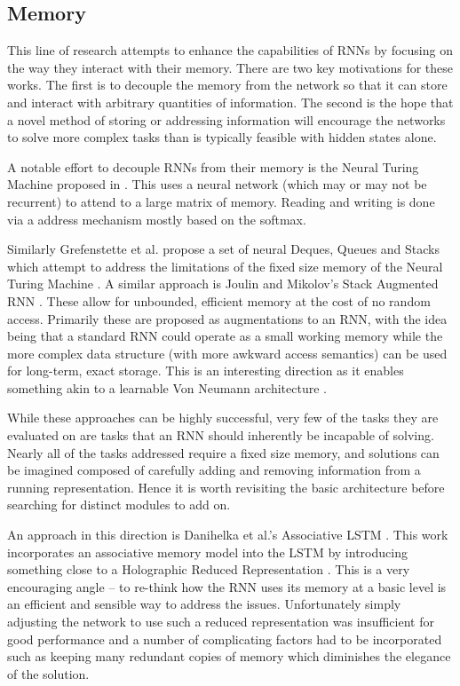 \subsection{Memory}
This line of research attempts to enhance the capabilities of RNNs by focusing on the way they
interact with their memory. There are two key motivations for these works. 
The first is to decouple the memory from the network so that it can store and interact with arbitrary
quantities of information. The second is the hope that a novel
method of storing or addressing information will encourage the networks to solve more complex
tasks than is typically feasible with hidden states alone.

A notable effort to decouple RNNs from their memory is the Neural Turing Machine proposed in
\autocite{Graves2014}. This uses a neural network (which may or may not be recurrent) to
attend to a large matrix of memory. Reading and writing is done via a
address mechanism mostly based on the softmax.

Similarly Grefenstette et al. propose a set of neural Deques, Queues and Stacks which attempt to
address the limitations of the fixed size memory of the Neural Turing Machine 
\autocite{Grefenstette2015}. A similar approach is Joulin and Mikolov's Stack Augmented
RNN \autocite{Joulin2015}. These allow for unbounded, efficient memory at the cost of
no random access. Primarily these are proposed as augmentations to an RNN,
with the idea being that a standard RNN could operate as a small working memory while the more
complex data structure (with more awkward access semantics) can be used for long-term, exact
storage. This is an interesting direction as it enables something akin to a learnable Von Neumann
architecture \autocite{Graves2014}.

While these approaches can be highly successful, very few of the tasks 
they are evaluated on are tasks that an RNN should inherently be
incapable of solving. Nearly all of the tasks addressed require a fixed size memory, and solutions
can be imagined composed of carefully adding and removing information from a running representation.
Hence it is worth revisiting the basic architecture before searching for distinct 
modules to add on.

An approach in this direction is Danihelka et al.'s Associative LSTM \autocite{Danihelka2016}. 
This work incorporates an associative memory model into the LSTM by introducing
 something close to a Holographic Reduced Representation \autocite{Plate1995}.
This is a very encouraging angle -- to re-think how the RNN uses its memory at a basic
level is an efficient and sensible way to address the issues.
Unfortunately simply adjusting the network to use such a reduced representation was insufficient for
good performance and a number of complicating factors had to be incorporated such as keeping many
redundant copies of memory which diminishes the elegance of the solution.

